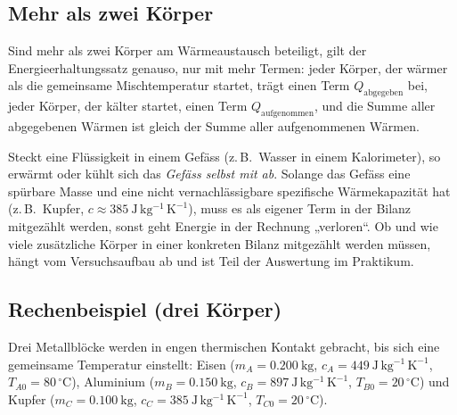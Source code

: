 \documentclass[11pt,a4paper]{article}
\newcommand{\Temp}{T}
\newcommand{\celsius}{\ensuremath{^{\circ}\mathrm{C}}}
\begin{document}
\subsection{Mehr als zwei Körper}
Sind mehr als zwei Körper am Wärmeaustausch beteiligt, gilt der Energieerhaltungssatz genauso, nur mit mehr Termen: jeder Körper, der wärmer als die gemeinsame Mischtemperatur startet, trägt einen Term $Q_{\text{abgegeben}}$ bei, jeder Körper, der kälter startet, einen Term $Q_{\text{aufgenommen}}$, und die Summe aller abgegebenen Wärmen ist gleich der Summe aller aufgenommenen Wärmen.

\begin{achtungbox}
Steckt eine Flüssigkeit in einem Gefäss (z.\,B.\ Wasser in einem Kalorimeter), so erwärmt oder kühlt sich das \emph{Gefäss selbst mit ab}. Solange das Gefäss eine spürbare Masse und eine nicht vernachlässigbare spezifische Wärmekapazität hat (z.\,B.\ Kupfer, $c\approx 385\ \mathrm{J\,kg^{-1}\,K^{-1}}$), muss es als eigener Term in der Bilanz mitgezählt werden, sonst geht Energie in der Rechnung „verloren“. Ob und wie viele zusätzliche Körper in einer konkreten Bilanz mitgezählt werden müssen, hängt vom Versuchsaufbau ab und ist Teil der Auswertung im Praktikum.
\end{achtungbox}

\subsection{Rechenbeispiel (drei Körper)}
Drei Metallblöcke werden in engen thermischen Kontakt gebracht, bis sich eine gemeinsame Temperatur einstellt: Eisen ($m_A=0.200\ \mathrm{kg}$, $c_A=449\ \mathrm{J\,kg^{-1}\,K^{-1}}$, $\Temp_{A0}=80\,\celsius$), Aluminium ($m_B=0.150\ \mathrm{kg}$, $c_B=897\ \mathrm{J\,kg^{-1}\,K^{-1}}$, $\Temp_{B0}=20\,\celsius$) und Kupfer ($m_C=0.100\ \mathrm{kg}$, $c_C=385\ \mathrm{J\,kg^{-1}\,K^{-1}}$, $\Temp_{C0}=20\,\celsius$).
\end{document}
